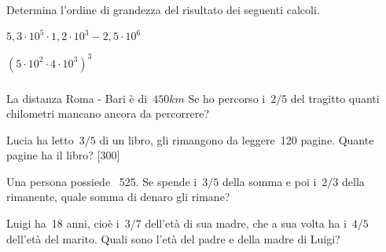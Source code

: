 \begin{esercizio}
 \label{ese:3.74}
Determina l'ordine di grandezza del risultato dei seguenti calcoli.
\begin{multicols}{2}
\begin{enumeratea}
\item \(5,3\cdot10^5\cdot1,2\cdot10^3-2,5\cdot10^6\)
\item \((5\cdot10^2\cdot4\cdot10^3)^3\)
\end{enumeratea}
\end{multicols}
\end{esercizio}

\subsubsection*{}

\begin{esercizio}
 \label{ese:3.75}
La distanza Roma - Bari è di~\(450\unit{km}\) Se ho percorso i~\(2/5\) del 
tragitto quanti chilometri
mancano ancora da percorrere?
\end{esercizio}

\begin{esercizio}[\Ast]
 \label{ese:3.76}
Lucia ha letto~\(3/5\) di un libro, gli rimangono da leggere~120 pagine. 
Quante pagine ha il libro? \hfill [300]
\end{esercizio}

\begin{esercizio}
 \label{ese:3.77}
Una persona possiede \officialeuro\ 525. Se spende i~\(3/5\) della somma e 
poi i~\(2/3\) della rimanente, quale somma di denaro gli rimane?
\end{esercizio}

\begin{esercizio}
 \label{ese:3.78}
Luigi ha~18 anni, cioè i~\(3/7\) dell'età di sua madre, che a sua volta ha 
i~\(4/5\) dell'età del marito. Quali sono l'età del padre e della madre di Luigi?
\end{esercizio}

\subsubsection*{}

